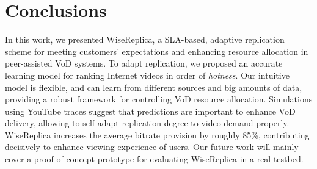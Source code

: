 \section{Conclusions}
\label{sec:conclusion}

In this work, we presented WiseReplica, a SLA-based, adaptive replication scheme for meeting customers' expectations and enhancing resource allocation in peer-assisted VoD systems. To adapt replication, we proposed an accurate learning model for ranking Internet videos in order of \emph{hotness}. Our intuitive model is flexible, and can learn from different sources and big amounts of data, providing a robust framework for controlling VoD resource allocation. Simulations using YouTube traces suggest that predictions are important to enhance VoD delivery, allowing to self-adapt replication degree to video demand properly. WiseReplica increases the average bitrate provision by roughly 85\%, contributing decisively to enhance viewing experience of users. Our future work will mainly cover a proof-of-concept prototype for evaluating WiseReplica in a real testbed.

